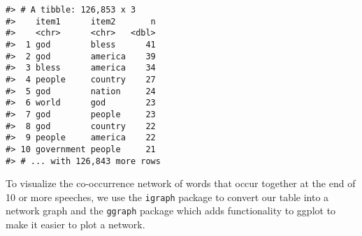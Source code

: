 \documentclass[
]{book}
\newenvironment{Shaded}{\begin{snugshade}}{\end{snugshade}}
\newcommand{\AttributeTok}[1]{\textcolor[rgb]{0.77,0.63,0.00}{#1}}
\newcommand{\CommentTok}[1]{\textcolor[rgb]{0.56,0.35,0.01}{\textit{#1}}}
\newcommand{\ConstantTok}[1]{\textcolor[rgb]{0.00,0.00,0.00}{#1}}
\newcommand{\DecValTok}[1]{\textcolor[rgb]{0.00,0.00,0.81}{#1}}
\newcommand{\FunctionTok}[1]{\textcolor[rgb]{0.00,0.00,0.00}{#1}}
\newcommand{\NormalTok}[1]{#1}
\newcommand{\OtherTok}[1]{\textcolor[rgb]{0.56,0.35,0.01}{#1}}
\newcommand{\SpecialCharTok}[1]{\textcolor[rgb]{0.00,0.00,0.00}{#1}}
\begin{document}
\begin{Shaded}
\end{Shaded}

\begin{verbatim}
#> # A tibble: 126,853 x 3
#>    item1      item2       n
#>    <chr>      <chr>   <dbl>
#>  1 god        bless      41
#>  2 god        america    39
#>  3 bless      america    34
#>  4 people     country    27
#>  5 god        nation     24
#>  6 world      god        23
#>  7 god        people     23
#>  8 god        country    22
#>  9 people     america    22
#> 10 government people     21
#> # ... with 126,843 more rows
\end{verbatim}

To visualize the co-occurrence network of words that occur together at the end of 10 or more speeches, we use the \texttt{igraph} package to convert our table into a network graph and the \texttt{ggraph} package which adds functionality to ggplot to make it easier to plot a network.
\end{document}
